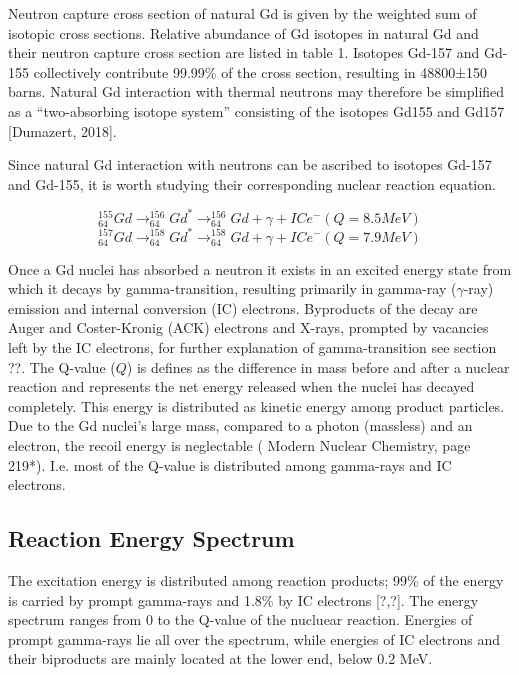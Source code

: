 
Neutron capture cross section of natural Gd is given by the weighted sum of isotopic cross sections. Relative abundance of Gd isotopes in natural Gd and their neutron capture cross section are listed in table 1. Isotopes Gd-157 and Gd-155 collectively contribute 99.99\% of the cross section, resulting in 48800±150 barns. Natural Gd interaction with thermal neutrons may therefore be simplified as a “two-absorbing isotope system” consisting of the isotopes Gd155 and Gd157 [Dumazert, 2018].


Since natural Gd interaction with neutrons can be ascribed to isotopes Gd-157 and Gd-155, it is worth studying their corresponding nuclear reaction equation.

\begin{equation}
    _{64}^{155}Gd \rightarrow _{64}^{156}Gd^* \rightarrow _{64}^{156}Gd + \gamma + ICe^-     (Q=8.5 MeV)
\end{equation}
\begin{equation}
    _{64}^{157}Gd \rightarrow _{64}^{158}Gd^* \rightarrow _{64}^{158}Gd + \gamma + ICe^-    (Q=7.9 MeV)
\end{equation}

Once a Gd nuclei has absorbed a neutron it exists in an excited energy state from which it decays by gamma-transition, resulting primarily in gamma-ray ($\gamma$-ray) emission and internal conversion (IC) electrons. Byproducts of the decay are Auger and Coster-Kronig (ACK) electrons and X-rays, prompted by vacancies left by the IC electrons, for further explanation of gamma-transition see section ??. The Q-value ($Q$) is defines as the difference in mass before and after a nuclear reaction and represents the net energy released when the nuclei has decayed completely. This energy is distributed as kinetic energy among product particles. Due to the Gd nuclei’s large mass, compared to a photon (massless) and an electron, the recoil energy is neglectable ( Modern Nuclear Chemistry, page 219*). I.e. most of the Q-value is distributed among gamma-rays and IC electrons.


\subsection{Reaction Energy Spectrum}
The excitation energy is distributed among reaction products; 99\% of the energy is carried by prompt gamma-rays and 1.8\% by IC electrons [?,?]. The energy spectrum ranges from 0 to the Q-value of the nucluear reaction. Energies of prompt gamma-rays lie all over the spectrum, while energies of IC electrons and their biproducts are mainly located at the lower end, below 0.2 MeV.

